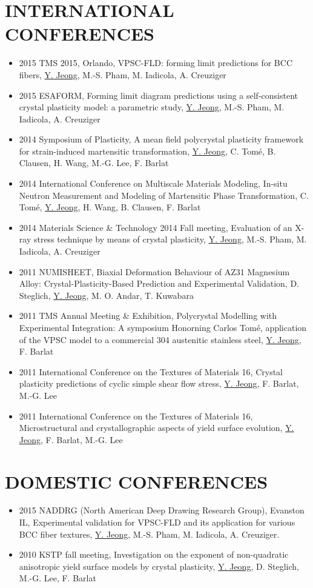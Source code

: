 \documentclass{res}
\begin{document}
\begin{resume}
  \section{INTERNATIONAL CONFERENCES}
  \begin{itemize}
  \item 2015 TMS 2015, Orlando, VPSC-FLD: forming limit predictions for BCC fibers, \underline{Y. Jeong}, M.-S. Pham, M. Iadicola, A. Creuziger
  \item 2015 ESAFORM, Forming limit diagram predictions using a self-consistent crystal plasticity model: a parametric study, \underline{Y. Jeong}, M.-S. Pham, M. Iadicola, A. Creuziger
  \item 2014 Symposium of Plasticity, A mean field polycrystal plasticity framework for strain-induced martensitic transformation, \underline{Y. Jeong}, C. Tom\'{e}, B. Clausen, H. Wang, M.-G. Lee, F. Barlat
  \item 2014 International Conference on Multiscale Materials Modeling, In-situ Neutron  Measurement and Modeling of Martensitic Phase Transformation, C. Tom\'{e}, \underline{Y. Jeong}, H. Wang, B. Clausen, F. Barlat
  \item 2014 Materials Science \& Technology 2014 Fall meeting, Evaluation of an X-ray stress technique by means of crystal plasticity, \underline{Y. Jeong}, M.-S. Pham, M. Iadicola, A. Creuziger
  \item 2011 NUMISHEET, Biaxial Deformation Behaviour of AZ31 Magnesium Alloy: Crystal-Plasticity-Based Prediction and Experimental Validation, D. Steglich, \underline{Y. Jeong}, M. O. Andar, T. Kuwabara
  \item 2011 TMS Annual Meeting \& Exhibition, Polycrystal Modelling with Experimental Integration: A symposium Honorning Carlos Tom\'e, application of the VPSC model to a commercial 304 austenitic stainless steel, \underline{Y. Jeong}, F. Barlat
  \item 2011 International Conference on the Textures of Materials 16, Crystal plasticity predictions of cyclic simple shear flow stress, \underline{Y. Jeong}, F. Barlat, M.-G. Lee
  \item 2011 International Conference on the Textures of Materials 16, Microstructural and crystallographic aspects of yield surface evolution, \underline{Y. Jeong}, F. Barlat, M.-G. Lee
  \end{itemize}

  \section{DOMESTIC CONFERENCES}
  \begin{itemize}
  \item 2015 NADDRG (North American Deep Drawing Research Group), Evanston IL, Experimental validation for VPSC-FLD and its application for various BCC fiber textures, \underline{Y. Jeong}, M.-S. Pham, M. Iadicola, A. Creuziger.
  \item 2010 KSTP fall meeting, Investigation on the exponent of non-quadratic anisotropic yield surface models by crystal plasticity, \underline{Y. Jeong}, D. Steglich, M.-G. Lee, F. Barlat
  \end{itemize}


\end{resume}
\end{document}
